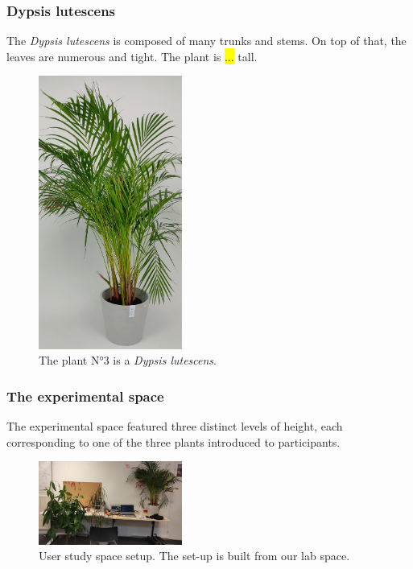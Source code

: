 \newpage

\subsubsection{Dypsis lutescens}

The \textit{Dypsis lutescens} is composed of many trunks and stems. On top of that, the leaves are numerous and tight. The plant is \hl{...} tall.

\begin{figure}[ht]
    \centering
    \includegraphics[width=0.42\textwidth, angle=-90]{Images/fougere_plant.jpg}
    \caption{The plant N°3 is a \textit{Dypsis lutescens}.}
    
    \vspace{-0.5cm}
    \label{fig:fougere_plant}
    \vspace{0.2cm}
\end{figure}



\subsubsection{The experimental space}

The experimental space featured three distinct levels of height, each corresponding to one of the three plants introduced to participants.

\begin{figure}[h]
    \centering
    \includegraphics[width=0.42\textwidth]{Images/setup_user_study.jpg}
    \caption{User study space setup. The set-up is built from our lab space.}
    
    \vspace{-0.5cm}
    \label{fig:setup_user_study}
    \vspace{0.2cm}
\end{figure}

\newpage

